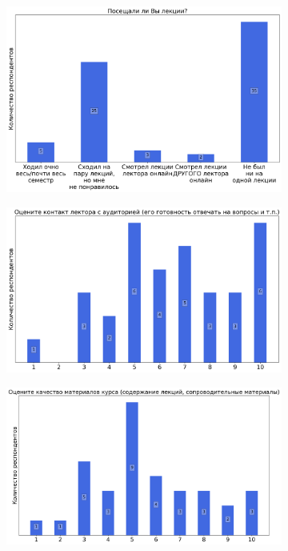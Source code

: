 		\begin{figure}[H]
			\centering
            \begin{subfigure}[b]{0.45\textwidth}
				\centering
				\includegraphics[width=\textwidth]{images/3 course/Вычислительная математика/lecturer-questions-Петров И.Б.-0.png}
			\end{subfigure}
			\begin{subfigure}[b]{0.45\textwidth}
				\centering
				\includegraphics[width=\textwidth]{images/3 course/Вычислительная математика/lecturer-marks-Петров И.Б.-0.png}
			\end{subfigure}
			\begin{subfigure}[b]{0.45\textwidth}
				\centering
				\includegraphics[width=\textwidth]{images/3 course/Вычислительная математика/lecturer-marks-Петров И.Б.-1.png}

\end{subfigure}
\end{figure}

